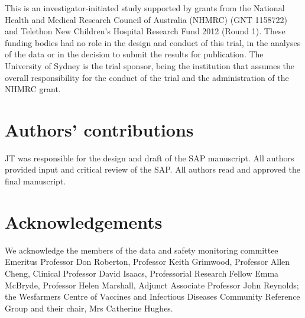 \documentclass{bmcart}
\begin{document}
\begin{backmatter}
This is an investigator-initiated study supported by grants from the National Health and Medical Research Council of Australia (NHMRC) (GNT 1158722) and Telethon New Children's Hospital Research Fund 2012 (Round 1).
These funding bodies had no role in the design and conduct of this trial, in the analyses of the data or in the decision to submit the results for publication.
The University of Sydney is the trial sponsor, being the institution that assumes the overall responsibility for the conduct of the trial and the administration of the NHMRC grant.

\section*{Authors' contributions}

JT was responsible for the design and draft of the SAP manuscript.
All authors provided input and critical review of the SAP.
All authors read and approved the final manuscript.

\section*{Acknowledgements}

We acknowledge the members of the data and safety monitoring committee Emeritus Professor Don Roberton, 
Professor Keith Grimwood, Professor Allen Cheng, Clinical Professor David Isaacs, 
Professorial Research Fellow Emma McBryde, Professor Helen Marshall, 
Adjunct Associate Professor John Reynolds; 
the Wesfarmers Centre of Vaccines and Infectious Diseases Community Reference Group and their chair, 
Mrs  Catherine Hughes.







\end{backmatter}
\end{document}

